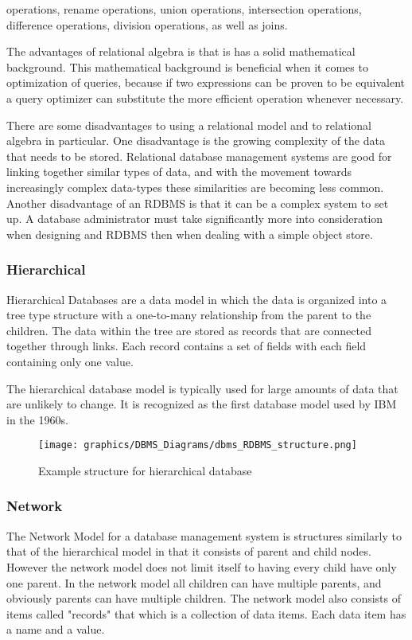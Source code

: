 \documentclass[letterpaper, 12pt]{article}
\renewcommand{\includegraphics}[2][]{\fbox{}}
\begin{document}
operations, rename operations, union operations, intersection operations, difference
operations, division operations, as well as joins. 
\par\vspace{\baselineskip}
The advantages of relational algebra is that is has a solid mathematical background. 
This mathematical background is beneficial when it comes to optimization of queries,
because if two expressions can be proven to be equivalent a query optimizer can 
substitute the more efficient operation whenever necessary.
\par\vspace{\baselineskip}
There are some disadvantages to using a relational model and to relational algebra in
particular. One disadvantage is the growing complexity of the data that needs to be 
stored. Relational database management systems are good for linking together similar types
of data, and with the movement towards increasingly complex data-types these similarities 
are becoming less common. Another disadvantage of an RDBMS is that it can be a complex
system to set up. A database administrator must take significantly more into consideration
when designing and RDBMS then when dealing with a simple object store. 

\subsubsection{Hierarchical}
Hierarchical Databases are a data model in which the data is organized into a tree type 
structure with a one-to-many relationship from the parent to the children. The data 
within the tree are stored as records that are connected together through links. Each
record contains a set of fields with each field containing only one value. 
\par\vspace{\baselineskip}
The hierarchical database model is typically used for large amounts of data that are 
unlikely to change. It is recognized as the first database model used by IBM in 
the 1960s.\cite{hierarchical_dbms_techopedia}
\par\vspace{\baselineskip}
\begin{figure}
  \centering
  \texttt{[image: graphics/DBMS\_Diagrams/dbms\_RDBMS\_structure.png]}
  \caption{Example structure for hierarchical database}
\end{figure}

\subsubsection{Network}
The Network Model for a database management system is structures similarly to that of the
hierarchical model in that it consists of parent and child nodes. However the network 
model does not limit itself to having every child have only one parent. In the network 
model all children can have multiple parents, and obviously parents can have multiple 
children. The network model also consists of items called "records" that which is a 
collection of data items. Each data item has a name and a value. 
\end{document}
